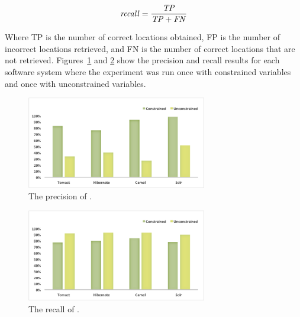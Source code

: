 \begin{equation}\label{recall_eq}
\mathit{recall} = \frac{\mathit{TP}}{{\mathit{TP}+\mathit{FN}}}
\end{equation}
 

Where TP is the number of correct locations obtained, FP is the number of incorrect locations retrieved, and FN is the number of correct locations that are not retrieved. Figures~\ref{fig:precision} and \ref{fig:recall} show the precision and recall results for each software system where the experiment was run once with constrained variables and once with unconstrained variables.


\begin{figure} [H]
  \centering\includegraphics [width = 0.7\textwidth, height = 0.3\textheight]{Charts/Precision.png}
  \caption{The precision of .}
  \label{fig:precision} 
\end{figure}

\begin{figure} [H]
  \centering\includegraphics [width = 0.7\textwidth, height = 0.3\textheight]{Charts/Recall.png}
  \caption{The recall of .}
  \label{fig:recall} 
\end{figure}

